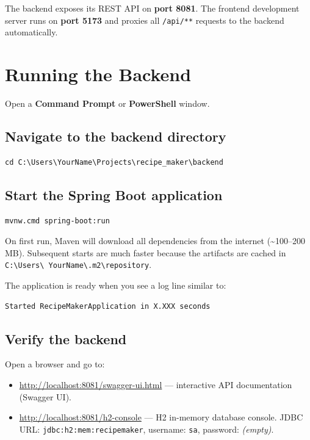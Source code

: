 \documentclass[12pt,a4paper]{article}
\begin{document}
The backend exposes its REST API on \textbf{port 8081}.  The frontend
development server runs on \textbf{port 5173} and proxies all
\texttt{/api/**} requests to the backend automatically.

\section{Running the Backend}

Open a \textbf{Command Prompt} or \textbf{PowerShell} window.

\subsection{Navigate to the backend directory}
\begin{lstlisting}
cd C:\Users\YourName\Projects\recipe_maker\backend
\end{lstlisting}

\subsection{Start the Spring Boot application}
\begin{lstlisting}
mvnw.cmd spring-boot:run
\end{lstlisting}

\begin{note}
On first run, Maven will download all dependencies from the internet
(\textasciitilde{}100--200 MB).  Subsequent starts are much faster because
the artifacts are cached in \texttt{C:\textbackslash Users\textbackslash
YourName\textbackslash .m2\textbackslash repository}.
\end{note}

The application is ready when you see a log line similar to:
\begin{lstlisting}
Started RecipeMakerApplication in X.XXX seconds
\end{lstlisting}

\subsection{Verify the backend}
Open a browser and go to:
\begin{itemize}[noitemsep]
  \item \url{http://localhost:8081/swagger-ui.html} — interactive API
        documentation (Swagger UI).
  \item \url{http://localhost:8081/h2-console} — H2 in-memory database
        console.  JDBC URL: \texttt{jdbc:h2:mem:recipemaker}, username:
        \texttt{sa}, password: \emph{(empty)}.
\end{itemize}
\end{document}
